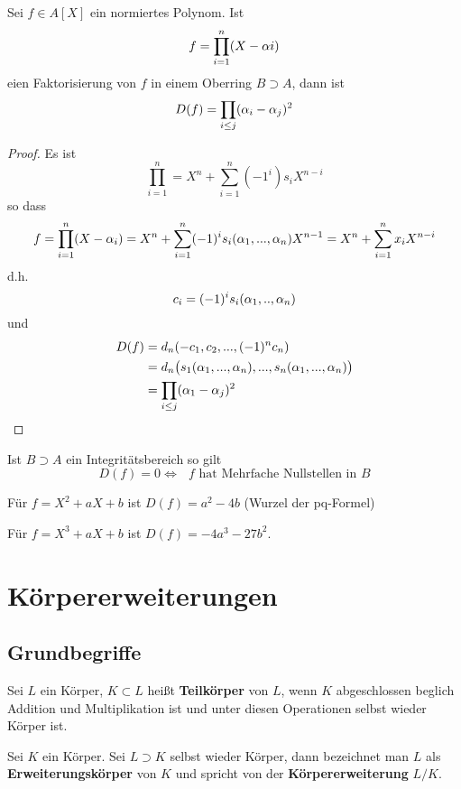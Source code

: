 	\begin{satz}
		Sei $f\in A[X]$ ein normiertes Polynom. Ist
		\[f=\prod_{i=1}^n(X-\alpha i)\]
		eien Faktorisierung von $f$ in einem Oberring $B\supset A$, dann ist
		\[D(f)=\prod_{i\leq j}(\alpha_i-\alpha_j)^2\]
	\end{satz}
	\begin{proof}
		Es ist
		\[\prod_{i=1}^n=X^n+\sum_{i=1}^n(-1^i)s_iX^{n-i}\]
		so dass
		\[f=\prod_{i=1}^n(X-\alpha_i)=X^n+\sum_{i=1}^{n}(-1)^is_i(\alpha_1,...,\alpha_n)X^{n-1}=X^n+\sum_{i=1}^{n}x_iX^{n-i}\]
		d.h.
		\[c_i=(-1)^is_i(\alpha_1,..,\alpha_n)\]
		und
		\begin{align*}
		D(f)&=d_n(-c_1,c_2,...,(-1)^nc_n)\\
		&=d_n\big(s_1(\alpha_1,...,\alpha_n),...,s_n(\alpha_1,...,\alpha_n)\big)\\
		&=\prod_{i\leq j}(\alpha_1-\alpha_j)^2
		\end{align*}
	\end{proof}

	\begin{satz}
		Ist $B\supset A$ ein Integritätsbereich so gilt
		\[D(f)=0\Leftrightarrow\text{ $f$ hat Mehrfache Nullstellen in $B$}\]
	\end{satz}

	\begin{exmlist}
		\begin{exm}
			Für $f=X^2+aX+b$ ist $D(f)=a^2-4b$ (Wurzel der pq-Formel)
		\end{exm}
		\begin{exm}
			Für $f=X^3+aX+b$ ist $D(f)=-4a^3-27b^2$.
		\end{exm}
	\end{exmlist}


\section{Körpererweiterungen}
	\subsection{Grundbegriffe}
	
	\begin{definition}
		Sei $L$ ein Körper, $K\subset L$ heißt \textbf{Teilkörper} von $L$, wenn $K$ abgeschlossen beglich Addition und Multiplikation ist und unter diesen Operationen selbst wieder Körper ist.
	\end{definition}

	\begin{definition}
		Sei $K$ ein Körper. Sei $L\supset K$ selbst wieder Körper, dann bezeichnet man $L$ als \textbf{Erweiterungskörper} von $K$ und spricht von der \textbf{Körpererweiterung} $L/K$.
	\end{definition}

